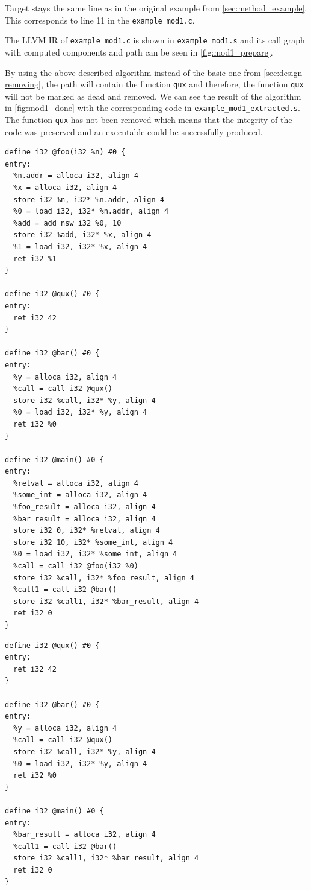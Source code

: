 \documentclass[12pt, twoside]{fithesis2}
\renewcommand{\_}{\leavevmode \kern0.07em\vbox{\hrule width0.4em}}
\begin{document}
Target stays the same line as in the original example from
\autoref{sec:method_example}.
This corresponds to line 11 in the \texttt{example_mod1.c}.

The LLVM IR of \texttt{example_mod1.c} is shown in
\texttt{example_mod1.s} and its call graph with computed components
and path can be seen in \autoref{fig:mod1_prepare}.

By using the above described algorithm instead of the basic one from
\autoref{sec:design-removing}, the path will contain the function
\texttt{qux} and therefore, the function \texttt{qux} will
not be marked as dead and removed.
We can see the result of the algorithm in \autoref{fig:mod1_done} with the
corresponding code in \texttt{example_mod1_extracted.s}.
The function \texttt{qux} has not been removed which means that the
integrity of the code was preserved and an executable could be successfully
produced.

\begin{verbatim}
define i32 @foo(i32 %n) #0 {
entry:
  %n.addr = alloca i32, align 4
  %x = alloca i32, align 4
  store i32 %n, i32* %n.addr, align 4
  %0 = load i32, i32* %n.addr, align 4
  %add = add nsw i32 %0, 10
  store i32 %add, i32* %x, align 4
  %1 = load i32, i32* %x, align 4
  ret i32 %1
}

define i32 @qux() #0 {
entry:
  ret i32 42
}

define i32 @bar() #0 {
entry:
  %y = alloca i32, align 4
  %call = call i32 @qux()
  store i32 %call, i32* %y, align 4
  %0 = load i32, i32* %y, align 4
  ret i32 %0
}

define i32 @main() #0 {
entry:
  %retval = alloca i32, align 4
  %some_int = alloca i32, align 4
  %foo_result = alloca i32, align 4
  %bar_result = alloca i32, align 4
  store i32 0, i32* %retval, align 4
  store i32 10, i32* %some_int, align 4
  %0 = load i32, i32* %some_int, align 4
  %call = call i32 @foo(i32 %0)
  store i32 %call, i32* %foo_result, align 4
  %call1 = call i32 @bar()
  store i32 %call1, i32* %bar_result, align 4
  ret i32 0
}
\end{verbatim}

\begin{verbatim}
define i32 @qux() #0 {
entry:
  ret i32 42
}

define i32 @bar() #0 {
entry:
  %y = alloca i32, align 4
  %call = call i32 @qux()
  store i32 %call, i32* %y, align 4
  %0 = load i32, i32* %y, align 4
  ret i32 %0
}

define i32 @main() #0 {
entry:
  %bar_result = alloca i32, align 4
  %call1 = call i32 @bar()
  store i32 %call1, i32* %bar_result, align 4
  ret i32 0
}
\end{verbatim}
\end{document}
